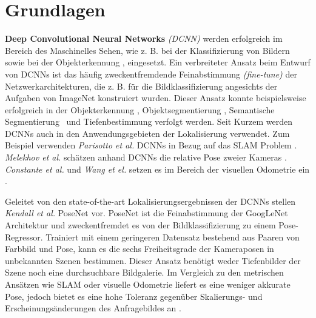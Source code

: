 \pagebreak
\section{Grundlagen}




\pagebreak
\textbf{Deep Convolutional Neural Networks} \textit{(DCNN)} werden erfolgreich im Bereich des Maschinelles Sehen, wie z. B. bei der Klassifizierung von Bildern \cite{krizhevskyImageNetClassificationDeep2012, simonyanVeryDeepConvolutional2014, heDeepResidualLearning2015} sowie bei der  Objekterkennung \cite{girshickRichFeatureHierarchies2013, renFasterRCNNRealTime2015b, girshickFastRCNN2015},  eingesetzt. 
Ein verbreiteter Ansatz beim Entwurf von DCNNs ist das häufig zweckentfremdende Feinabstimmung \textit{(fine-tune)} der Netzwerkarchitekturen, die z. B. für die Bildklassifizierung angesichts der Aufgaben von ImageNet \cite{russakovskyImageNetLargeScale2014} konstruiert wurden. Dieser Ansatz konnte beispielsweise erfolgreich in der Objekterkennung \cite{girshickFastRCNN2015}, Objektsegmentierung \cite{kokkinosPushingBoundariesBoundary2015, maninisConvolutionalOrientedBoundaries2016}, Semantische Segmentierung \cite{nohLearningDeconvolutionNetwork2015, hazirbasFuseNetIncorporatingDepth2017a} und Tiefenbestimmung \cite{liDepthSurfaceNormal2015} verfolgt werden.
Seit Kurzem werden DCNNs auch in den Anwendungsgebieten der Lokalisierung verwendet. Zum Beispiel verwenden \textit{Parisotto et al.} DCNNs in Bezug auf das SLAM Problem \cite{parisottoGlobalPoseEstimation2018}. \textit{Melekhov et al.} schätzen anhand DCNNs die relative Pose zweier Kameras \cite{melekhovRelativeCameraPose2017}. \textit{Constante et al.} und \textit{Wang et el.} setzen es im Bereich der visuellen Odometrie ein \cite{costanteExploringRepresentationLearning2016, wangDeepVOEndtoendVisual2017}.

Geleitet von den state-of-the-art Lokalisierungsergebnissen der DCNNs stellen \textit{Kendall et al.} PoseNet \cite{kendallPoseNetConvolutionalNetwork2015} vor.
PoseNet ist die Feinabstimmung der GoogLeNet \cite{szegedyGoingDeeperConvolutions2015} Architektur und zweckentfremdet es von der Bildklassifizierung zu einem Pose-Regressor. Trainiert mit einem geringeren Datensatz bestehend aus Paaren von Farbbild und Pose, kann es die sechs Freiheitsgrade der Kameraposen in unbekannten Szenen bestimmen. Dieser Ansatz benötigt weder Tiefenbilder der Szene noch eine durchsuchbare Bildgalerie. Im Vergleich zu den metrischen Ansätzen wie SLAM oder visuelle Odometrie liefert es eine weniger akkurate Pose, jedoch bietet es eine hohe Toleranz gegenüber Skalierungs- und Erscheinungsänderungen des Anfragebildes an \cite{piascoSurveyVisualBasedLocalization2018}.


